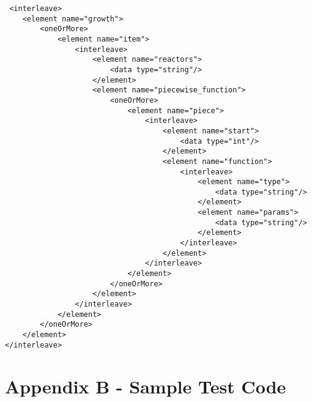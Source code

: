 \documentclass[12pt,letterpaper]{article}
\newenvironment{code}{\captionsetup{type=listing}}{}
\begin{document}
\begin{code}

\begin{verbatim}
 <interleave>
    <element name="growth">
        <oneOrMore>
            <element name="item">
                <interleave>
                    <element name="reactors">
                        <data type="string"/>
                    </element>
                    <element name="piecewise_function">
                        <oneOrMore>
                            <element name="piece">
                                <interleave>
                                    <element name="start">
                                        <data type="int"/>
                                    </element>
                                    <element name="function">
                                        <interleave>
                                            <element name="type">
                                                <data type="string"/>
                                            </element>
                                            <element name="params">
                                                <data type="string"/>
                                            </element>
                                        </interleave>
                                    </element>
                                </interleave>
                            </element>
                        </oneOrMore>
                    </element>
                </interleave>
            </element>
        </oneOrMore>
    </element>
</interleave>
\end{verbatim}
\label{code:fun_reac}
\end{code}

\section{Appendix B - Sample Test Code }
\end{document}
